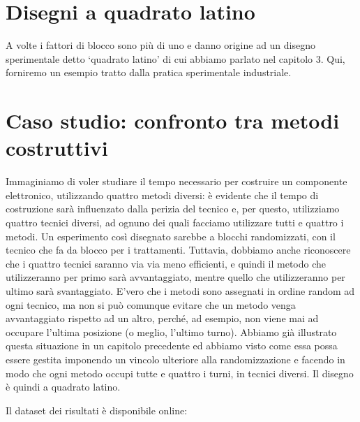 \documentclass[a4paper,12pt,oneside]{book}
\begin{document}
\hypertarget{disegni-a-quadrato-latino-1}{%
\section{Disegni a quadrato latino}\label{disegni-a-quadrato-latino-1}}

A volte i fattori di blocco sono più di uno e danno origine ad un disegno sperimentale detto `quadrato latino' di cui abbiamo parlato nel capitolo 3. Qui, forniremo un esempio tratto dalla pratica sperimentale industriale.

\hypertarget{caso-studio-confronto-tra-metodi-costruttivi}{%
\section{Caso studio: confronto tra metodi costruttivi}\label{caso-studio-confronto-tra-metodi-costruttivi}}

Immaginiamo di voler studiare il tempo necessario per costruire un componente elettronico, utilizzando quattro metodi diversi: è evidente che il tempo di costruzione sarà influenzato dalla perizia del tecnico e, per questo, utilizziamo quattro tecnici diversi, ad ognuno dei quali facciamo utilizzare tutti e quattro i metodi. Un esperimento così disegnato sarebbe a blocchi randomizzati, con il tecnico che fa da blocco per i trattamenti. Tuttavia, dobbiamo anche riconoscere che i quattro tecnici saranno via via meno efficienti, e quindi il metodo che utilizzeranno per primo sarà avvantaggiato, mentre quello che utilizzeranno per ultimo sarà svantaggiato. E'vero che i metodi sono assegnati in ordine random ad ogni tecnico, ma non si può comunque evitare che un metodo venga avvantaggiato rispetto ad un altro, perché, ad esempio, non viene mai ad occupare l'ultima posizione (o meglio, l'ultimo turno). Abbiamo già illustrato questa situazione in un capitolo precedente ed abbiamo visto come essa possa essere gestita imponendo un vincolo ulteriore alla randomizzazione e facendo in modo che ogni metodo occupi tutte e quattro i turni, in tecnici diversi. Il disegno è quindi a quadrato latino.

Il dataset dei risultati è disponibile online:
\end{document}
